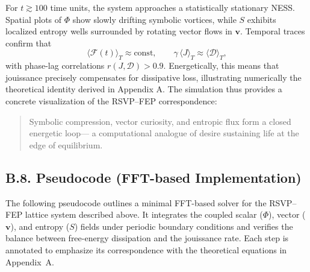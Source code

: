 \documentclass[12pt,a4paper]{article}
\begin{document}
For \(t\gtrsim100\) time units, the system approaches a statistically stationary NESS.
Spatial plots of \(\Phi\) show slowly drifting symbolic vortices,
while \(S\) exhibits localized entropy wells surrounded by rotating vector flows in \(\mathbf{v}\).
Temporal traces confirm that
\[
\langle \mathcal{F}(t)\rangle_T \approx \text{const}, \qquad
\gamma\,\langle J\rangle_T \approx \langle\mathcal{D}\rangle_T,
\]
with phase-lag correlations \(r(J,\mathcal{D})>0.9\).
Energetically, this means that jouissance precisely compensates for dissipative loss,
illustrating numerically the theoretical identity derived in Appendix A.
The simulation thus provides a concrete visualization of the RSVP–FEP correspondence:
\begin{quote}
Symbolic compression, vector curiosity, and entropic flux form a closed energetic loop—
a computational analogue of desire sustaining life at the edge of equilibrium.
\end{quote}

\subsection*{B.8. Pseudocode (FFT-based Implementation)}

\noindent
The following pseudocode outlines a minimal FFT-based solver for the RSVP–FEP lattice system described above.  
It integrates the coupled scalar ($\Phi$), vector ($\mathbf{v}$), and entropy ($S$) fields under periodic boundary conditions and verifies the balance between free-energy dissipation and the jouissance rate.
Each step is annotated to emphasize its correspondence with the theoretical equations in Appendix~A.
\end{document}
